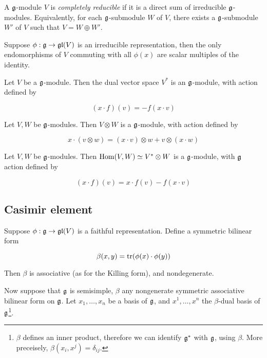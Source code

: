 \documentclass{article}
\begin{document}
\begin{definition}
     A \(\mathfrak{g}\)-module \(V\) is \emph{completely reducible} if it is a direct sum of irreducible \(\mathfrak{g}\)-modules. Equivalently, for each \(\mathfrak{g}\)-submodule \(W\) of \(V\), there exists a \(\mathfrak{g}\)-submodule \(W'\) of \(V\) such that \(V = W \oplus W'\).
\end{definition}

\begin{lemma}
    [Schur] Suppose \(\phi : \mathfrak{g} \to \mathfrak{g}\mathfrak{l}(V)\) is an irreducible representation, then the only endomorphisms of \(V\) commuting with all \(\phi(x)\) are scalar multiples of the identity.
\end{lemma}

\begin{definition}
     Let \(V\) be a \(\mathfrak{g}\)-module. Then the dual vector space \(V^*\) is an \(\mathfrak{g}\)-module, with action defined by

    \[(x\cdot f)(v) = -f(x \cdot v)\]
\end{definition}

\begin{definition}
     Let \(V, W\) be \(\mathfrak{g}\)-modules. Then \(V \otimes W\) is a \(\mathfrak{g}\)-module, with action defined by

    \[x \cdot (v \otimes w) = (x \cdot v) \otimes w + v \otimes (x \cdot w)\]
\end{definition}

\begin{definition}
     Let \(V, W\) be \(\mathfrak{g}\)-modules. Then \(\operatorname{Hom}(V, W) \simeq V^* \otimes W\) is a \(\mathfrak{g}\)-module, with \(\mathfrak{g}\) action defined by

    \[(x \cdot f)(v) = x \cdot f(v) - f(x \cdot v)\]
\end{definition}

\subsection{Casimir element}

Suppose \(\phi : \mathfrak{g} \to \mathfrak{g}\mathfrak{l}(V)\) is a faithful representation. Define a symmetric bilinear form

\[\beta(x, y) = \tr(\phi(x) \cdot \phi(y))\]

Then \(\beta\) is associative (as for the Killing form), and nondegenerate.

Now suppose that \(\mathfrak{g}\) is semisimple, \(\beta\) any nongenerate symmetric associative bilinear form on \(\mathfrak{g}\). Let \(x_1, \dots, x_n\) be a basis of \(\mathfrak{g}\), and \(x^1, \dots, x^n\) the \(\beta\)-dual basis of \(\mathfrak{g}\)\footnote{\(\beta\) defines an inner product, therefore we can identify \(\mathfrak{g}^*\) with \(\mathfrak{g}\), using \(\beta\). More preceisely, \(\beta(x_i, x^j) = \delta_{ij}\).}.
\end{document}
